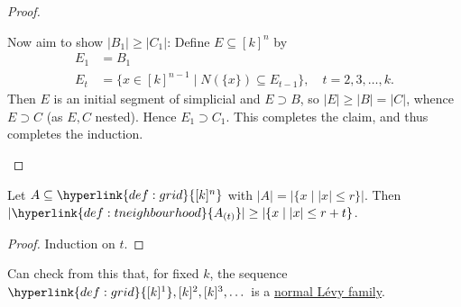 \documentclass{article}
\let\subset\subseteq
\begin{document}
\begin{proof}
\begin{itemize}
      Now aim to show $|B_1| \geq |C_1|$:
      Define $E \subset [k]^n$ by
      \begin{align*}
        E_1 &= B_1 \\
        E_t &= \{x \in [k]^{n-1} \mid N(\{x\}) \subset E_{t-1}\}, \quad t=2,3,\dotsc,k.
      \end{align*}
      Then $E$ is an initial segment of simplicial and $E \supset B$, so $|E| \geq |B| = |C|$, whence $E \supset C$ (as $E,C$ nested). Hence $E_1 \supset C_1$.
      This completes the claim, and thus completes the induction. \qedhere
  \end{itemize}
\end{proof}
\begin{ncor}\label{cor:2.11}
  Let $A \subset \hyperlink{def:grid}{[k]^n}$ with $|A| = |\{x \mid |x| \leq r\}|$.
  Then $|\hyperlink{def:tneighbourhood}{A_{(t)}}| \geq |\{x \mid |x| \leq r + t\}$.
\end{ncor}
\begin{proof}
  Induction on $t$.
\end{proof}
\begin{remark}
  Can check from this that, for fixed $k$, the sequence $\hyperlink{def:grid}{[k]^1}, [k]^2, [k]^3, \dotsc$ is a \hyperlink{def:levyfam}{normal L\'evy family}.
\end{remark}
\end{document}
